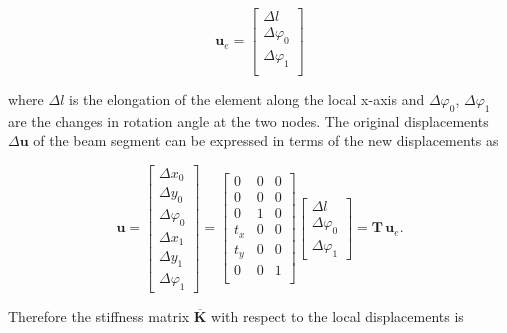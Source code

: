 \begin{equation}
\boldsymbol{u}_{e} = \begin{bmatrix}
\Delta l \\
\Delta \varphi_0 \\
\Delta \varphi_1 \\
\end{bmatrix}
\end{equation}

where $\Delta l$ is the elongation of the element along the local x-axis and $\Delta \varphi_0$, $\Delta \varphi_1$ are the changes in rotation angle at the two nodes.
The original displacements $\Delta\boldsymbol{u}$ of the beam segment can be expressed in terms of the new displacements as

\begin{equation}
\boldsymbol{u} =
\begin{bmatrix}
\Delta x_0 \\ \Delta y_0 \\ \Delta \varphi_0 \\ \Delta x_1 \\ \Delta y_1 \\ \Delta \varphi_1
\end{bmatrix}
=
\begin{bmatrix}
0 & 0 & 0 \\
0 & 0 & 0 \\
0 & 1 & 0 \\
t_x & 0 & 0 \\
t_y & 0 & 0 \\
0 & 0 & 1 \\
\end{bmatrix}
\begin{bmatrix}\Delta l \\ \Delta\varphi_0 \\ \Delta\varphi_1 \end{bmatrix}
=
\boldsymbol{T}\,\boldsymbol{u}_e.
\end{equation}

Therefore the stiffness matrix $\overline{\boldsymbol{K}}$ with respect to the local displacements is

%
%
%

